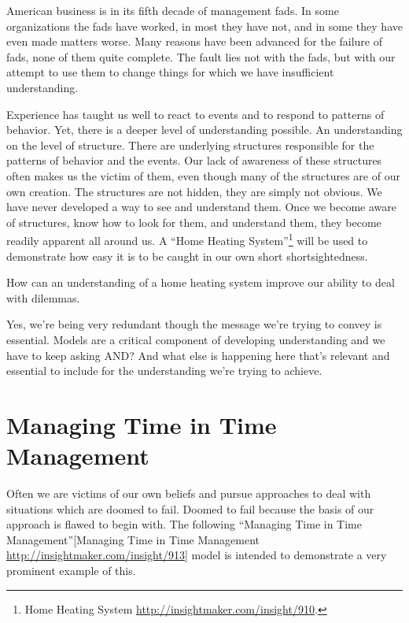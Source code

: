 \documentclass[]{memoir}
\begin{document}
American business is in its fifth decade of management fads. In some
organizations the fads have worked, in most they have not, and in some
they have even made matters worse. Many reasons have been advanced for
the failure of fads, none of them quite complete. The fault lies not
with the fads, but with our attempt to use them to change things for
which we have insufficient understanding.

Experience has taught us well to react to events and to respond to
patterns of behavior. Yet, there is a deeper level of understanding
possible. An understanding on the level of structure. There are
underlying structures responsible for the patterns of behavior and the
events. Our lack of awareness of these structures often makes us the
victim of them, even though many of the structures are of our own
creation. The structures are not hidden, they are simply not obvious. We
have never developed a way to see and understand them. Once we become
aware of structures, know how to look for them, and understand them,
they become readily apparent all around us. A ``Home Heating
System''\footnote{Home Heating System
  \url{http://insightmaker.com/insight/910}.} will be used to
demonstrate how easy it is to be caught in our own short
shortsightedness.

\FloatBarrier 

\begin{model}[frametitle={Model: Home Heating System}] 

 How can an understanding of a home heating system improve our ability to deal with dilemmas.




 \end{model}

Yes, we're being very redundant though the message we're trying to
convey is essential. Models are a critical component of developing
understanding and we have to keep asking AND? And what else is happening
here that's relevant and essential to include for the understanding
we're trying to achieve.

\section{Managing Time in Time Management}

Often we are victims of our own beliefs and pursue approaches to deal
with situations which are doomed to fail. Doomed to fail because the
basis of our approach is flawed to begin with. The following ``Managing
Time in Time Management''{[}Managing Time in Time Management
\url{http://insightmaker.com/insight/913}{]} model is intended to
demonstrate a very prominent example of this.
\end{document}
